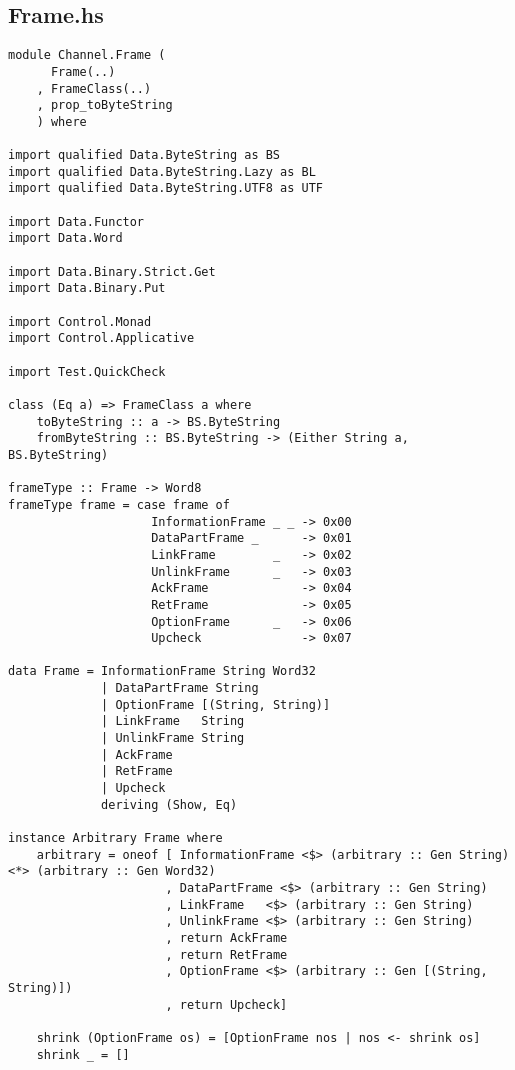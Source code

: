\documentclass[russian,utf8,simple,emptystyle]{eskdtext}
\begin{document}
\subsection{Frame.hs}
\begin{lstlisting}
module Channel.Frame (
      Frame(..)
    , FrameClass(..)
    , prop_toByteString
    ) where

import qualified Data.ByteString as BS
import qualified Data.ByteString.Lazy as BL
import qualified Data.ByteString.UTF8 as UTF

import Data.Functor
import Data.Word 

import Data.Binary.Strict.Get
import Data.Binary.Put

import Control.Monad
import Control.Applicative

import Test.QuickCheck

class (Eq a) => FrameClass a where
    toByteString :: a -> BS.ByteString
    fromByteString :: BS.ByteString -> (Either String a, BS.ByteString)

frameType :: Frame -> Word8
frameType frame = case frame of 
                    InformationFrame _ _ -> 0x00
                    DataPartFrame _      -> 0x01
                    LinkFrame        _   -> 0x02
                    UnlinkFrame      _   -> 0x03
                    AckFrame             -> 0x04
                    RetFrame             -> 0x05
                    OptionFrame      _   -> 0x06
                    Upcheck              -> 0x07

data Frame = InformationFrame String Word32
             | DataPartFrame String
             | OptionFrame [(String, String)]
             | LinkFrame   String 
             | UnlinkFrame String 
             | AckFrame    
             | RetFrame    
             | Upcheck
             deriving (Show, Eq)
 
instance Arbitrary Frame where
    arbitrary = oneof [ InformationFrame <$> (arbitrary :: Gen String) <*> (arbitrary :: Gen Word32)
                      , DataPartFrame <$> (arbitrary :: Gen String)
                      , LinkFrame   <$> (arbitrary :: Gen String)
                      , UnlinkFrame <$> (arbitrary :: Gen String)
                      , return AckFrame
                      , return RetFrame
                      , OptionFrame <$> (arbitrary :: Gen [(String, String)])
                      , return Upcheck]

    shrink (OptionFrame os) = [OptionFrame nos | nos <- shrink os]
    shrink _ = []


\end{lstlisting}
\end{document}
